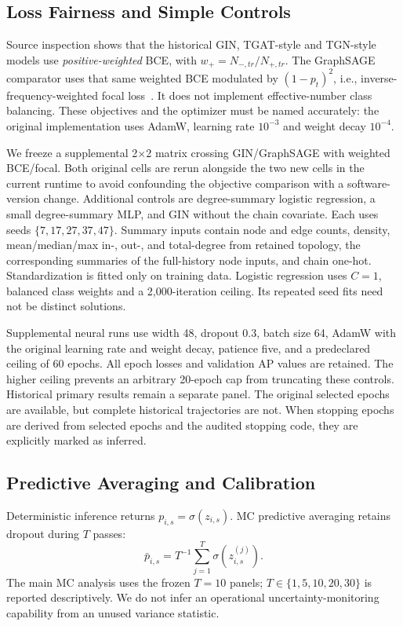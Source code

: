 \documentclass[applsci,article,submit,pdftex,moreauthors]{Definitions/mdpi}
\begin{document}
\subsection{Loss Fairness and Simple Controls}
Source inspection shows that the historical GIN, TGAT-style and TGN-style models use \emph{positive-weighted} BCE, with $w_+=N_{-,tr}/N_{+,tr}$. The GraphSAGE comparator uses that same weighted BCE modulated by $(1-p_t)^2$, i.e., inverse-frequency-weighted focal loss~\cite{lin2017focal}. It does not implement effective-number class balancing. These objectives and the optimizer must be named accurately: the original implementation uses AdamW, learning rate $10^{-3}$ and weight decay $10^{-4}$.

We freeze a supplemental 2$\times$2 matrix crossing GIN/GraphSAGE with weighted BCE/focal. Both original cells are rerun alongside the two new cells in the current runtime to avoid confounding the objective comparison with a software-version change. Additional controls are degree-summary logistic regression, a small degree-summary MLP, and GIN without the chain covariate. Each uses seeds $\{7,17,27,37,47\}$. Summary inputs contain node and edge counts, density, mean/median/max in-, out-, and total-degree from retained topology, the corresponding summaries of the full-history node inputs, and chain one-hot. Standardization is fitted only on training data. Logistic regression uses $C=1$, balanced class weights and a 2,000-iteration ceiling. Its repeated seed fits need not be distinct solutions.

Supplemental neural runs use width 48, dropout 0.3, batch size 64, AdamW with the original learning rate and weight decay, patience five, and a predeclared ceiling of 60 epochs. All epoch losses and validation AP values are retained. The higher ceiling prevents an arbitrary 20-epoch cap from truncating these controls. Historical primary results remain a separate panel. The original selected epochs are available, but complete historical trajectories are not. When stopping epochs are derived from selected epochs and the audited stopping code, they are explicitly marked as inferred.

\subsection{Predictive Averaging and Calibration}
Deterministic inference returns $p_{i,s}=\sigma(z_{i,s})$. MC predictive averaging retains dropout during $T$ passes:
\begin{equation}
\bar p_{i,s}=T^{-1}\sum_{j=1}^{T}\sigma(z^{(j)}_{i,s}).
\end{equation}
The main MC analysis uses the frozen $T=10$ panels; $T\in\{1,5,10,20,30\}$ is reported descriptively. We do not infer an operational uncertainty-monitoring capability from an unused variance statistic.
\end{document}
